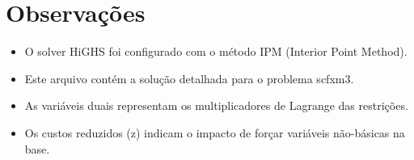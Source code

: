 \documentclass[12pt]{article}
\begin{document}
\begin{longtable}{@{}cc@{}}
\end{longtable}


\section{Observações}

\begin{itemize}
\item O solver HiGHS foi configurado com o método IPM (Interior Point Method).
\item Este arquivo contém a solução detalhada para o problema scfxm3.
\item As variáveis duais representam os multiplicadores de Lagrange das restrições.
\item Os custos reduzidos (z) indicam o impacto de forçar variáveis não-básicas na base.
\end{itemize}
\end{document}
